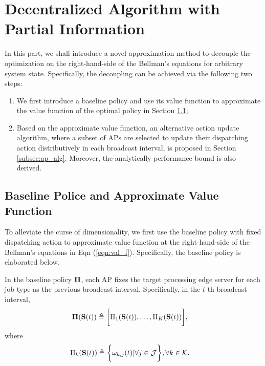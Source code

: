 \section{Decentralized Algorithm with Partial Information}
\label{sec:algorithm}

In this part, we shall introduce a novel approximation method to decouple the optimization on the right-hand-side of the Bellman's equations for arbitrary system state.
Specifically, the decoupling can be achieved via the following two steps:
\begin{enumerate}
    \item We first introduce a baseline policy and use its value function to approximate the value function of the optimal policy in Section \ref{subsec:baseline};
    \item Based on the approximate value function, an alternative action update algorithm, where a subset of APs are selected to update their dispatching action distributively in each broadcast interval, is proposed in Section \ref{subsec:ap_alg}.
    Moreover, the analytically performance bound is also derived.
\end{enumerate}

\subsection{Baseline Police and Approximate Value Function}
\label{subsec:baseline}
To alleviate the curse of dimensionality, we first use the baseline policy with fixed dispatching action to approximate value function at the right-hand-side of the Bellman's equations in Eqn (\ref{eqn:val_f}).
Specifically, the baseline policy is elaborated below.

\begin{policy}
    In the baseline policy $\boldsymbol{\Pi}$, each AP fixes the target processing edge server for each job type as the previous broadcast interval. Specifically, in the $t$-th broadcast interval,
    \begin{align}
        \boldsymbol{\Pi}(\mathbf{S}(t)) &\triangleq \bigg[ \Pi_{1}(\mathbf{S}(t)), \dots, \Pi_{K}(\mathbf{S}(t)) \bigg],
    \end{align}
    where 
    \begin{align}
        \Pi_{k}(\mathbf{S}(t)) &\triangleq \bigg\{
            \omega_{k,j}(t) | \forall j\in\mathcal{J}
        \bigg\}, \forall k\in\mathcal{K}.
    \end{align}
\end{policy}


